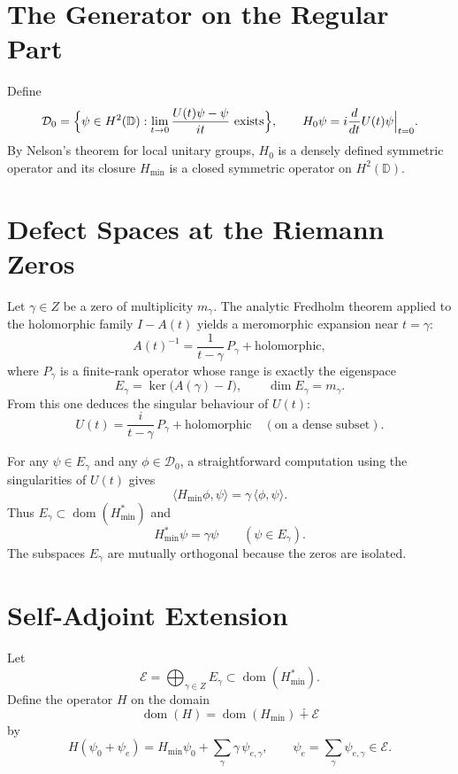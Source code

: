 \documentclass[11pt,a4paper]{article}
\begin{document}
\section{The Generator on the Regular Part}
Define
\[
\mathcal{D}_0 = \Bigl\{ \psi\in H^2(\mathbb{D}) : \lim_{t\to 0} \frac{U(t)\psi-\psi}{it}\text{ exists} \Bigr\},
\qquad
H_0\psi = i\frac{d}{dt}U(t)\psi\Big|_{t=0}.
\]
By Nelson's theorem for local unitary groups, \(H_0\) is a densely defined symmetric operator and its closure \(H_{\min}\) is a closed symmetric operator on \(H^2(\mathbb{D})\).

\section{Defect Spaces at the Riemann Zeros}
Let \(\gamma\in Z\) be a zero of multiplicity \(m_\gamma\).  The analytic Fredholm theorem applied to the holomorphic family \(I-A(t)\) yields a meromorphic expansion near \(t=\gamma\):
\[
A(t)^{-1} = \frac{1}{t-\gamma}\,P_\gamma + \text{holomorphic},
\]
where \(P_\gamma\) is a finite‑rank operator whose range is exactly the eigenspace
\[
E_\gamma = \ker\!\big(A(\gamma)-I\big),\qquad \dim E_\gamma = m_\gamma.
\]
From this one deduces the singular behaviour of \(U(t)\):
\[
U(t) = \frac{i}{t-\gamma}\,P_\gamma + \text{holomorphic}\quad (\text{on a dense subset}).
\]

For any \(\psi\in E_\gamma\) and any \(\phi\in\mathcal{D}_0\), a straightforward computation using the singularities of \(U(t)\) gives
\[
\langle H_{\min}\phi,\psi\rangle = \gamma\,\langle\phi,\psi\rangle .
\]
Thus \(E_\gamma \subset \operatorname{dom}(H_{\min}^*)\) and
\[
H_{\min}^* \psi = \gamma\psi \qquad (\psi\in E_\gamma).
\]
The subspaces \(E_\gamma\) are mutually orthogonal because the zeros are isolated.

\section{Self‑Adjoint Extension}
Let
\[
\mathcal{E} = \bigoplus_{\gamma\in Z} E_\gamma \subset \operatorname{dom}(H_{\min}^*).
\]
Define the operator \(H\) on the domain
\[
\operatorname{dom}(H) = \operatorname{dom}(H_{\min}) \dotplus \mathcal{E}
\]
by
\[
H(\psi_0 + \psi_e) = H_{\min}\psi_0 + \sum_{\gamma} \gamma\,\psi_{e,\gamma},
\qquad \psi_e = \sum_\gamma \psi_{e,\gamma}\in\mathcal{E}.
\]
\end{document}
